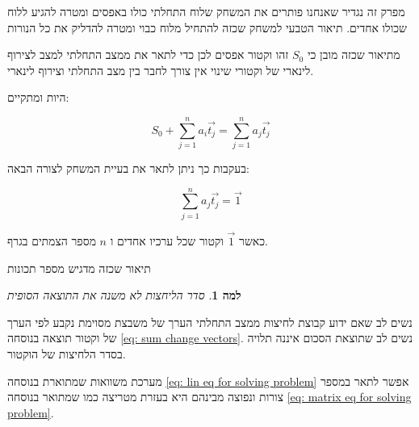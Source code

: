 \documentclass[12pt,twoside]{article}
\newtheorem{lemma}{למה}[section]
\newcommand{\sumi}[1]{\sum_{#1=1}^n}
\begin{document}
מפרק זה נגדיר שאנחנו פותרים את המשחק שלוח התחלתי כולו באפסים
ומטרה להגיע ללוח שכולו אחדים.
תיאור הטבעי למשחק שכזה להתחיל מלוח כבוי ומטרה להדליק את כל הנורות

מתיאור שכזה מובן כי 
$S_0$
זהו וקטור אפסים לכן כדי לתאר את ממצב התחלתי
למצב לצירוף לינארי של וקטורי שינוי 
אין צורך לחבר בין מצב התחלתי וצירוף לינארי.

היות ומתקיים:

\begin{equation}
    \label{eq: sum change vectors}
    S_0 + \sumi{j} a_i \vec{t_j} =  \sumi{j} a_j \vec{t_j}
\end{equation}

בעקבות כך ניתן לתאר את בעיית המשחק לצורה הבאה:

\begin{equation}
    \label{eq: lin eq for solving problem}
    \sumi{j} a_j \vec{t_j} = \vec{1}
\end{equation}

כאשר
$\vec{1}$
וקטור שכל ערכיו אחדים
ו
$n$
מספר הצמתים בגרף.

תיאור שכזה מדגיש מספר תכונות 

\begin{lemma}
    סדר הליחצות לא משנה את התוצאה הסופית
\end{lemma}
נשים לב שאם ידוע קבוצת לחיצות ממצב התחלתי הערך של משבצת מסוימת נקבע לפי 
הערך של וקטור תוצאה
בנוסחה
\ref{eq: sum change vectors}.
נשים לב שתוצאת הסכום איננה תלויה בסדר הלחיצות של הוקטור. 

מערכת משוואות 
שמתוארת בנוסחה
\ref{eq: lin eq for solving problem}
אפשר לתאר במספר צורות ונפוצה מבינהם היא
בעזרת מטריצה כמו שמתואר 
בנוסחה 
\ref{eq: matrix eq for solving problem}.
\end{document}
